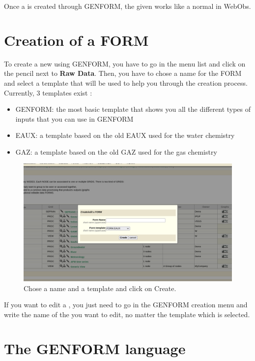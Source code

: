 Once a  is created through GENFORM, the given  works like a normal  in WebObs.

\section{Creation of a FORM} \label{genform_creation}

To create a new  using GENFORM, you have to go in the  menu list and click on the pencil next to \textbf{Raw Data}. Then, you have to chose a name for the FORM and select a template that will be used to help you through the creation process. Currently, 3 templates exist : 

\begin{itemize}
	\item GENFORM: the most basic template that shows you all the different types of inputs that you can use in GENFORM
	\item EAUX: a template based on the old EAUX  used for the water chemistry
	\item GAZ: a template based on the old GAZ  used for the gas chemistry
\end{itemize}

\begin{figure}[!h]
	\centering
	\includegraphics[width=\textwidth]{figures/GENFORM_creation.png}
	\caption{Chose a name and a template and click on Create.}
	\label{GENFORM_creation}
\end{figure}

If you want to edit a , you just need to go in the GENFORM creation menu and write the name of the  you want to edit, no matter the template which is selected.

\section{The GENFORM language}

